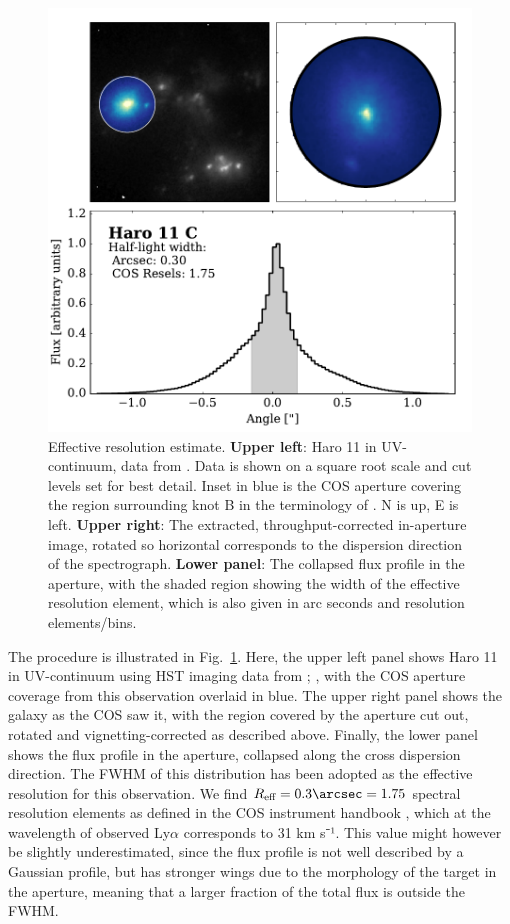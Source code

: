 \documentclass[twocolumn,]{aastex61}
\begin{document}
\begin{figure}
\centering
\includegraphics[width=1.000\hsize]{../Figs/EffResol.pdf}
\caption{Effective resolution estimate. \textbf{Upper left}: Haro 11 in
UV-continuum, data from \citet{Ostlin2009, Hayes2009}. Data is
shown on a square root scale and cut levels set for best detail. Inset
in blue is the COS aperture covering the region surrounding knot
B in the terminology of \citet{Vader1993}. N is up, E is left.
\textbf{Upper right}: The extracted, throughput-corrected in-aperture
image, rotated so horizontal corresponds to the dispersion direction of
the spectrograph. \textbf{Lower panel}: The collapsed flux profile in
the aperture, with the shaded region showing the width of the effective
resolution element, which is also given in arc seconds and resolution
elements/bins.}\label{fig:resol}
\end{figure}

The procedure is illustrated in Fig.~\ref{fig:resol}. Here, the upper left panel
shows Haro 11 in UV-continuum using HST imaging data from \citet{Ostlin2009};
\citet{Hayes2009}, with the COS aperture coverage from this observation overlaid
in blue. The upper right panel shows the galaxy as the COS saw it, with the
region covered by the aperture cut out, rotated and vignetting-corrected as
described above.  Finally, the lower panel shows the flux profile in the
aperture, collapsed along the cross dispersion direction. The FWHM of this
distribution has been adopted as the effective resolution for this observation.
We find $R_{\text{eff}} = 0.3 \arcsec = 1.75$ spectral resolution elements as
defined in the COS instrument handbook \cite{CosHandbook}, which at the
wavelength of observed Ly$\alpha$ corresponds to 31 km s⁻¹. This value might
however be slightly underestimated, since the flux profile is not well described
by a Gaussian profile, but has stronger wings due to the morphology of the
target in the aperture, meaning that a larger fraction of the total flux is
outside the FWHM.
\end{document}
